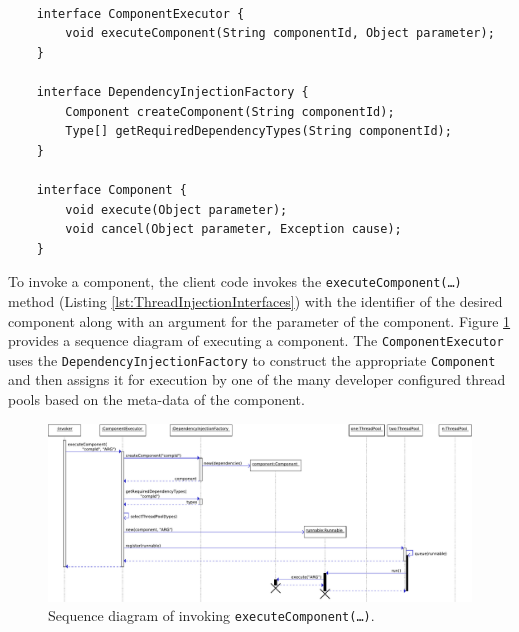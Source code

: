 \documentclass[prodmode]{style/acmlarge}
\begin{document}
\begin{lstlisting}[float,label=lst:ThreadInjectionInterfaces]

    interface ComponentExecutor {
        void executeComponent(String componentId, Object parameter);
    }

    interface DependencyInjectionFactory {
        Component createComponent(String componentId);
        Type[] getRequiredDependencyTypes(String componentId);
    }

    interface Component {
        void execute(Object parameter); 
        void cancel(Object parameter, Exception cause);
    }
\end{lstlisting}

To invoke a component, the client code invokes the
\texttt{executeComponent(\ldots)} method (Listing
\ref{lst:ThreadInjectionInterfaces}) with the identifier of the desired
component along with an argument for the parameter of the component.
Figure \ref{fig:ExecuteComponentSequenceDiagram} provides a sequence diagram of
executing a component.  The \texttt{ComponentExecutor} uses the
\texttt{DependencyInjectionFactory} to construct the appropriate
\texttt{Component} and then assigns it for execution by one of the many
developer configured thread pools based on the meta-data of the component.

\begin{figure}[!t]
\centering
\includegraphics[width=6in]{ExecuteComponentSequenceDiagram}
\caption{Sequence diagram of invoking \texttt{executeComponent(\ldots)}.}
\label{fig:ExecuteComponentSequenceDiagram}
\end{figure}
\end{document}
